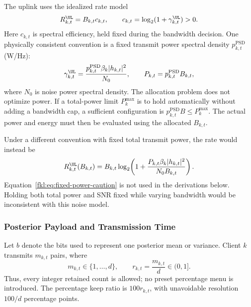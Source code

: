 The uplink uses the idealized rate model
\begin{equation}
 R_{k,t}^{\UL}=B_{k,t}c_{k,t},\qquad
 c_{k,t}=\log_2(1+\gamma_{k,t}^{\UL})>0.
 \label{fkl:eq:rate}
\end{equation}
Here $c_{k,t}$ is spectral efficiency, held fixed during the bandwidth decision. One physically consistent convention is a fixed transmit power spectral density $p_{k,t}^{\mathrm{PSD}}$ (W/Hz):
\begin{equation}
 \gamma_{k,t}^{\UL}
 =\frac{p_{k,t}^{\mathrm{PSD}}\beta_k|h_{k,t}|^2}{N_0},
 \qquad P_{k,t}=p_{k,t}^{\mathrm{PSD}}B_{k,t},
 \label{fkl:eq:snr-psd}
\end{equation}
where $N_0$ is noise power spectral density. The allocation problem does not optimize power. If a total-power limit $P_k^{\max}$ is to hold automatically without adding a bandwidth cap, a sufficient configuration is $p_{k,t}^{\mathrm{PSD}}B\le P_k^{\max}$. The actual power and energy must then be evaluated using the allocated $B_{k,t}$.

Under a different convention with fixed total transmit power, the rate would instead be
\begin{equation}
 R_{k,t}^{\UL}(B_{k,t})
 =B_{k,t}\log_2\!\left(1+
 \frac{P_{k,t}\beta_k|h_{k,t}|^2}{N_0B_{k,t}}\right).
 \label{fkl:eq:fixed-power-caution}
\end{equation}
Equation~\eqref{fkl:eq:fixed-power-caution} is not used in the derivations below. Holding both total power and SNR fixed while varying bandwidth would be inconsistent with this noise model.

\subsubsection{Posterior Payload and Transmission Time}
Let $b$ denote the bits used to represent one posterior mean or variance. Client $k$ transmits $m_{k,t}$ pairs, where
\begin{equation}
 m_{k,t}\in\{1,\ldots,d\},\qquad
 r_{k,t}=\frac{m_{k,t}}{d}\in(0,1].
 \label{fkl:eq:retention}
\end{equation}
Thus, every integer retained count is allowed; no preset percentage menu is introduced. The percentage keep ratio is $100r_{k,t}$, with unavoidable resolution $100/d$ percentage points.

